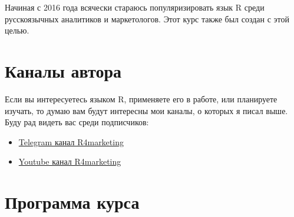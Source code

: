 \documentclass[
]{book}
\providecommand{\tightlist}{%
  \setlength{\itemsep}{0pt}\setlength{\parskip}{0pt}}
\begin{document}
Начиная с 2016 года всячески стараюсь популяризировать язык R среди русскоязычных аналитиков и маркетологов. Этот курс также был создан с этой целью.

\hypertarget{ux43aux430ux43dux430ux43bux44b-ux430ux432ux442ux43eux440ux430}{%
\section*{Каналы автора}\label{ux43aux430ux43dux430ux43bux44b-ux430ux432ux442ux43eux440ux430}}

Если вы интересуетесь языком R, применяете его в работе, или планируете изучать, то думаю вам будут интересны мои каналы, о которых я писал выше. Буду рад видеть вас среди подписчиков:

\begin{itemize}
\tightlist
\item
  \href{https://t.me/R4marketing}{Telegram канал R4marketing}
\item
  \href{https://www.youtube.com/R4marketing/?sub_confirmation=1}{Youtube канал R4marketing}
\end{itemize}

\hypertarget{ux43fux440ux43eux433ux440ux430ux43cux43cux430-ux43aux443ux440ux441ux430}{%
\section*{Программа курса}\label{ux43fux440ux43eux433ux440ux430ux43cux43cux430-ux43aux443ux440ux441ux430}}
\end{document}

